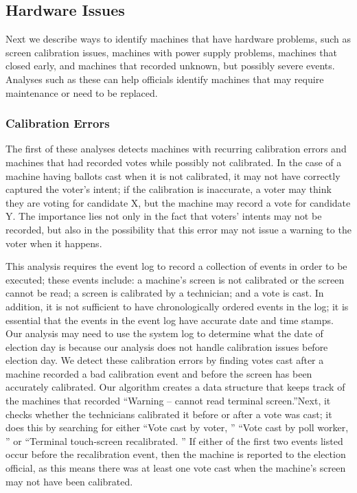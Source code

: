 \subsection{Hardware Issues}
Next we describe ways to identify machines that have hardware problems, such as screen calibration issues, machines with power supply problems, machines that closed early, and machines that recorded unknown, but possibly severe events.  Analyses such as these can help officials identify machines that may require maintenance or need to be replaced.  

\subsubsection{Calibration Errors}
The first of these analyses detects machines with recurring calibration errors and machines that had recorded votes while possibly not calibrated.  In the case of a machine having ballots cast when it is not calibrated, it may not have correctly captured the voter's intent; if the calibration is inaccurate, a voter may think they are voting for candidate X, but the machine may record a vote for candidate Y.  The importance lies not only in the fact that voters' intents may not be recorded, but also in the possibility that this error may not issue a warning to the voter when it happens.    

This analysis requires the event log to record a collection of events in order to be executed; these events include: a machine's screen is not calibrated or the screen cannot be read; a screen is calibrated by a technician; and a vote is cast.  In addition, it is not sufficient to have chronologically ordered events in the log; it is essential that the events in the event log have accurate date and time stamps. Our analysis may need to use the system log to determine what the date of election day is because our analysis does not handle calibration issues before election day.  We detect these calibration errors by finding votes cast after a machine recorded a bad calibration event and before the screen has been accurately calibrated.  Our algorithm creates a data structure that keeps track of the machines that recorded \textquotedblleft Warning – cannot read terminal screen.\textquotedblright \hspace{2 mm}Next, it checks whether the technicians calibrated it before or after a vote was cast; it does this by searching for either \textquotedblleft Vote cast by voter, \textquotedblright \hspace{1 mm} \textquotedblleft Vote cast by poll worker, \textquotedblright \hspace{1 mm} or \textquotedblleft Terminal touch-screen recalibrated. \textquotedblright \hspace{2 mm} If either of the first two events listed occur before the recalibration event, then the machine is reported to the election official, as this means there was at least one vote cast when the machine's screen may not have been calibrated.  

